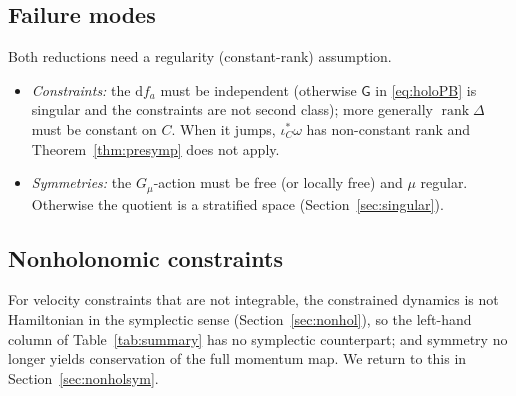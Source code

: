 \documentclass[11pt,a4paper]{article}
\numberwithin{equation}{section}
\theoremstyle{plain}
\theoremstyle{definition}
\theoremstyle{remark}
\newcommand{\rank}{\operatorname{rank}}
\newcommand{\dd}{\mathrm{d}}
\begin{document}
\subsection{Failure modes}

Both reductions need a regularity (constant-rank) assumption.
\begin{itemize}
\item \emph{Constraints:} the $\dd f_a$ must be independent (otherwise $\mathsf G$ in \eqref{eq:holoPB} is singular and the constraints are not second class); more generally $\rank\Delta$ must be constant on $C$. When it jumps, $\iota_C^*\omega$ has non-constant rank and Theorem~\ref{thm:presymp} does not apply.
\item \emph{Symmetries:} the $G_\mu$-action must be free (or locally free) and $\mu$ regular. Otherwise the quotient is a stratified space (Section~\ref{sec:singular}).
\end{itemize}

\subsection{Nonholonomic constraints}

For velocity constraints that are not integrable, the constrained dynamics is not Hamiltonian in the symplectic sense (Section~\ref{sec:nonhol}), so the left-hand column of Table~\ref{tab:summary} has no symplectic counterpart; and symmetry no longer yields conservation of the full momentum map. We return to this in Section~\ref{sec:nonholsym}.
\end{document}

